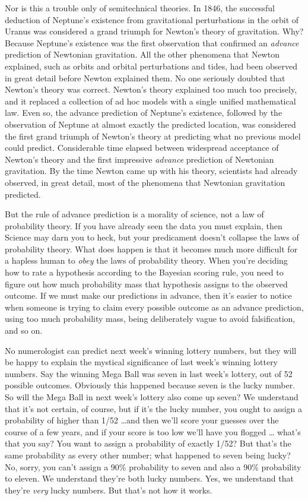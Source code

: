 {
 Nor is this a trouble only of semitechnical theories. In 1846, the
successful deduction of Neptune's existence from
gravitational perturbations in the orbit of Uranus was considered a
grand triumph for Newton's theory of gravitation. Why?
Because Neptune's existence was the first observation
that confirmed an \textit{advance} prediction of Newtonian gravitation.
All the other phenomena that Newton explained, such as orbits and
orbital perturbations and tides, had been observed in great detail
before Newton explained them. No one seriously doubted that
Newton's theory was correct. Newton's
theory explained too much too precisely, and it replaced a collection
of ad hoc models with a single unified mathematical law. Even so, the
advance prediction of Neptune's existence, followed by
the observation of Neptune at almost exactly the predicted location,
was considered the first grand triumph of Newton's
theory at predicting what no previous model could predict. Considerable
time elapsed between widespread acceptance of Newton's
theory and the first impressive \textit{advance} prediction of
Newtonian gravitation. By the time Newton came up with his theory,
scientists had already observed, in great detail, most of the phenomena
that Newtonian gravitation predicted.}

{
 But the rule of advance prediction is a morality of science, not a
law of probability theory. If you have already seen the data you must
explain, then Science may darn you to heck, but your predicament
doesn't collapse the laws of probability theory. What
does happen is that it becomes much more difficult for a hapless human
to \textit{obey} the laws of probability theory. When
you're deciding how to rate a hypothesis according to
the Bayesian scoring rule, you need to figure out how much probability
mass that hypothesis assigns to the observed outcome. If we must make
our predictions in advance, then it's easier to notice
when someone is trying to claim every possible outcome as an advance
prediction, using too much probability mass, being deliberately vague
to avoid falsification, and so on.}

{
 No numerologist can predict next week's winning
lottery numbers, but they will be happy to explain the mystical
significance of last week's winning lottery numbers.
Say the winning Mega Ball was seven in last week's
lottery, out of 52 possible outcomes. Obviously this happened because
seven is the lucky number. So will the Mega Ball in next
week's lottery also come up seven? We understand that
it's not certain, of course, but if
it's the lucky number, you ought to assign a
probability of higher than 1/52 \ldots and then we'll
score your guesses over the course of a few years, and if your score is
too low we'll have you flogged \ldots
what's that you say? You want to assign a probability
of exactly 1/52? But that's the same probability as
every other number; what happened to seven being lucky? No, sorry, you
can't assign a 90\% probability to seven and also a
90\% probability to eleven. We understand they're both
lucky numbers. Yes, we understand that they're
\textit{very} lucky numbers. But that's not how it
works.}

